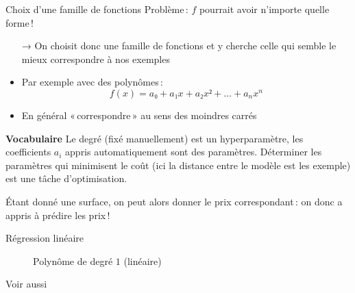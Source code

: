 \documentclass[hyperref={unicode}, xcolor={svgnames}, french]{beamer}
\begin{document}
\begin{frame}{Choix d'une famille de fonctions}
    Problème : $f$ pourrait avoir n'importe quelle forme !
    \begin{itemize}
        \item[→] On choisit donc une famille de fonctions et y cherche celle qui semble le mieux correspondre à nos exemples
        \item Par exemple avec des polynômes :
            \begin{equation}
                f(x) = a₀ + a₁x + a₂x²+ … + a_nx^n
            \end{equation}
        \item En général « correspondre » au sens des moindres carrés
    \end{itemize}
    \textbf{Vocabulaire} Le degré (fixé manuellement) est un \alert{hyperparamètre}, les coefficients $a_i$ appris automatiquement sont des \alert{paramètres}.
    Déterminer les paramètres qui minimisent le coût (ici la distance entre le modèle est les exemple) est une tâche d'\alert{optimisation}.

    Étant donné une surface, on peut alors donner le prix correspondant : on donc a appris à prédire les prix !
\end{frame}

\begin{frame}{Régression linéaire}
    \vspace{-1\bigskipamount}
    \begin{figure}
        \tikzset{external/export=true}
        \caption{Polynôme de degré $1$ (linéaire)}
    \end{figure}

    Voir aussi 
\end{frame}
\end{document}
